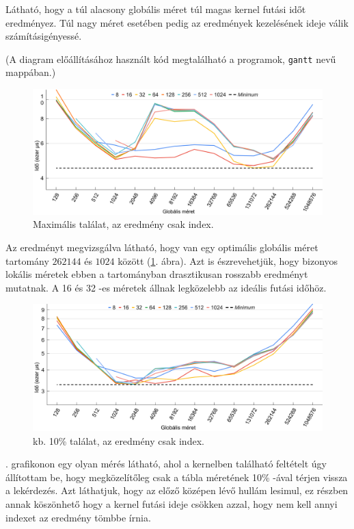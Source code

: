Látható, hogy a túl alacsony globális méret túl magas kernel futási időt eredményez. Túl nagy méret esetében pedig az eredmények kezelésének ideje válik számításigényessé.

(A diagram előállításához használt kód megtalálható a programok, \texttt{gantt} nevű mappában.)

\begin{figure}[h!]
\centering
\includegraphics[width=\textwidth]{images/graph/global_size_1.png}
\caption{Maximális találat, az eredmény csak index.}
\label{fig:global_size_1}
\end{figure}

Az eredményt megvizsgálva látható, hogy van egy optimális globális méret tartomány $262144$ és $1024$ között (\ref{fig:global_size_1}. ábra).
Azt is észrevehetjük, hogy bizonyos lokális méretek ebben a tartományban drasztikusan rosszabb eredményt mutatnak.
A 16 és 32 -es méretek állnak legközelebb az ideális futási időhöz.

\begin{figure}[h!]
\centering
\includegraphics[width=\textwidth]{images/graph/global_size_2.png}
\caption{kb. 10\% találat, az eredmény csak index.}
\label{fig:global_size_2}
\end{figure}

. grafikonon egy olyan mérés látható, ahol a kernelben található feltételt úgy állítottam be, hogy megközelítőleg csak a tábla méretének 10\% -ával térjen vissza a lekérdezés.
Azt láthatjuk, hogy az előző középen lévő hullám lesimul, ez részben annak köszönhető hogy a kernel futási ideje csökken azzal, hogy nem kell annyi indexet az eredmény tömbbe írnia.

